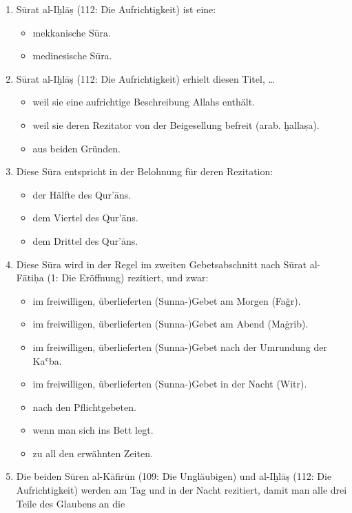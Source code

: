\begin{enumerate}[leftmargin=1.6em,resume]
\item Sūrat al-Iḫlāṣ (112: Die Aufrichtigkeit) ist eine:
  \begin{itemize}
    \item mekkanische Sūra. \item medinesische Sūra.
  \end{itemize}
\item Sūrat al-Iḫlāṣ (112: Die Aufrichtigkeit) erhielt diesen Titel, \ldots{}
  \begin{itemize}
    \item weil sie eine aufrichtige Beschreibung Allahs enthält.
    \item weil sie deren Rezitator von der Beigesellung befreit (arab. ḫallaṣa).
    \item aus beiden Gründen.
  \end{itemize}
\item Diese Sūra entspricht in der Belohnung für deren Rezitation:
  \begin{itemize}
    \item der Hälfte des Qur’āns. \item dem Viertel des Qur’āns. \item dem Drittel des
      Qur’āns.
  \end{itemize}
\item Diese Sūra wird in der Regel im zweiten Gebetsabschnitt nach Sūrat al-Fātiḥa (1: Die
  Eröffnung) rezitiert, und zwar:
  \begin{itemize}
    \item im freiwilligen, überlieferten (Sunna-)Gebet am Morgen (Fağr).
    \item im freiwilligen, überlieferten (Sunna-)Gebet am Abend (Maġrib).
    \item im freiwilligen, überlieferten (Sunna-)Gebet nach der Umrundung der Kaʿba.
    \item im freiwilligen, überlieferten (Sunna-)Gebet in der Nacht (Witr).
    \item nach den Pflichtgebeten.
    \item wenn man sich ins Bett legt.
    \item zu all den erwähnten Zeiten.
  \end{itemize}
\item Die beiden Sūren al-Kāfirūn (109: Die Ungläubigen) und al-Iḫlāṣ (112: Die Aufrichtigkeit)
  werden am Tag und in der Nacht rezitiert, damit man alle drei Teile des Glaubens an die

\end{enumerate}

